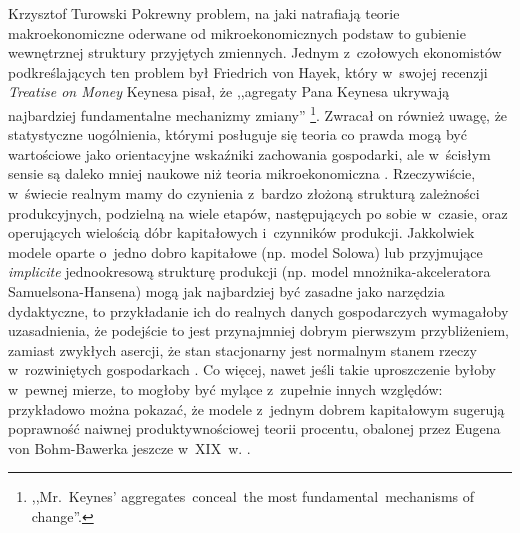 \begin{artplenv}{Krzysztof Turowski}
Pokrewny problem, na jaki natrafiają teorie makroekonomiczne oderwane od mikroekonomicznych podstaw to gubienie
wewnętrznej struktury przyjętych zmiennych. Jednym z~czołowych ekonomistów podkreślających ten problem był Friedrich
von Hayek, który w~swojej recenzji \textit{Treatise on Money} Keynesa pisał, że ,,agregaty Pana Keynesa ukrywają
najbardziej fundamentalne mechanizmy zmiany''
\parencite[s.~277]{hayek_reflections_1931}\footnote{,,Mr.~Keynes'
aggregates~conceal~the most fundamental~mechanisms of change''.}. Zwracał on również uwagę, że statystyczne uogólnienia,
którymi posługuje się teoria co prawda mogą być wartościowe jako orientacyjne wskaźniki zachowania gospodarki,
ale w~ścisłym sensie są daleko mniej naukowe niż teoria mikroekonomiczna
\parencite{hayek_competition_2002}.
Rzeczywiście, w~świecie realnym mamy do czynienia z~bardzo złożoną strukturą zależności produkcyjnych, podzielną na
wiele etapów, następujących po sobie w~czasie, oraz operujących wielością dóbr kapitałowych i~czynników produkcji.
Jakkolwiek modele oparte o~jedno dobro kapitałowe (np. model Solowa) lub przyjmujące \textit{implicite} jednookresową
strukturę produkcji (np. model mnożnika-akceleratora Samuelsona-Hansena) mogą jak najbardziej być zasadne jako
narzędzia dydaktyczne, to przykładanie ich do realnych danych gospodarczych wymagałoby uzasadnienia, że podejście to
jest przynajmniej dobrym pierwszym przybliżeniem, zamiast zwykłych asercji, że stan stacjonarny jest normalnym stanem
rzeczy w~rozwiniętych gospodarkach
\parencite{solow_growth_1970}.
Co więcej, nawet jeśli takie uproszczenie
byłoby w~pewnej mierze, to mogłoby być mylące z~zupełnie innych względów: przykładowo można pokazać, że modele z~jednym
dobrem kapitałowym sugerują poprawność naiwnej produktywnościowej teorii procentu, obalonej przez Eugena von
Bohm-Bawerka jeszcze w~XIX~w.
\parencite{murphy_dangers_2005}.


\end{artplenv}

